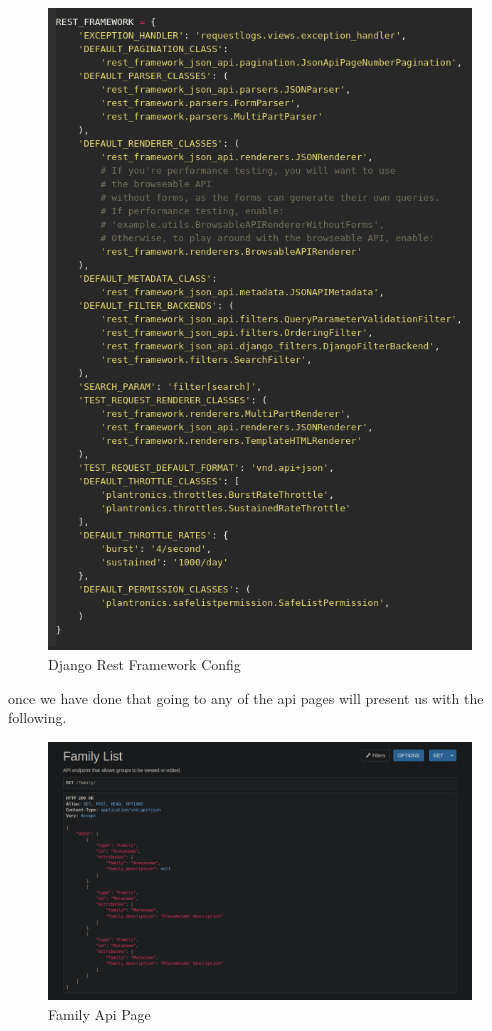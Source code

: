 \documentclass{article}
\begin{document}
        
        \begin{figure}[!htb]
            \centering
            \caption{Django Rest Framework Config}
            \includegraphics[scale=0.50]{format1}
        \end{figure}
    
    once we have done that going to any of the api pages will present us with the following.
    
    
    \begin{figure}[!htb]
        \centering
        \caption{Family Api Page}
        \includegraphics[scale=0.50]{format2}
    \end{figure}
\end{document}
